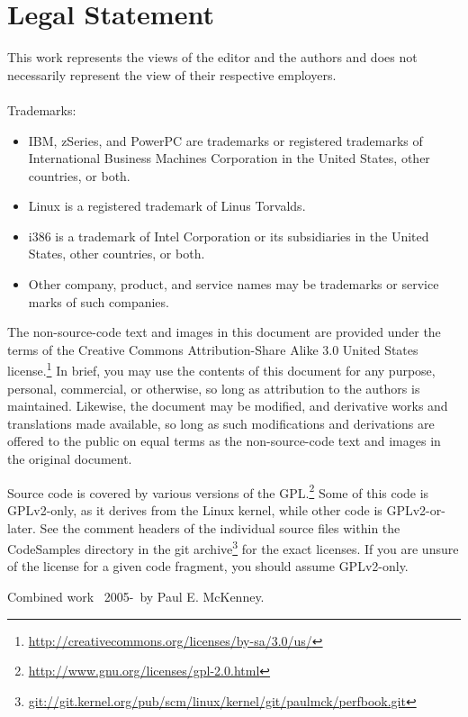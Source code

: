 
\IfTwoColumn{\onecolumn}{}

\section*{Legal Statement}

This work represents the views of the editor and the authors and does not
necessarily represent the view of their respective employers. \\
\\
Trademarks:
\begin{itemize}
\item	IBM, zSeries, and PowerPC are trademarks or registered trademarks
	of International Business Machines Corporation in the United
	States, other countries, or both.
\item	Linux is a registered trademark of Linus Torvalds.
\item	i386 is a trademark of Intel Corporation or its subsidiaries
	in the United States, other countries, or both.
\item	Other company, product, and service names may be trademarks or
	service marks of such companies.
\end{itemize}

The non-source-code text and images in this document are provided under
the terms of the Creative Commons Attribution-Share Alike 3.0 United
States license.\footnote{
	\url{http://creativecommons.org/licenses/by-sa/3.0/us/}}
In brief, you may use the contents of this document for any purpose,
personal, commercial, or otherwise, so long as attribution to the
authors is maintained.  Likewise, the document may be modified,
and derivative works and translations made available, so long as
such modifications and derivations are offered to the public on equal
terms as the non-source-code text and images in the original document.

Source code is covered by various versions of the GPL.\footnote{
	\url{http://www.gnu.org/licenses/gpl-2.0.html}}
Some of this code is GPLv2-only, as it derives from the Linux kernel,
while other code is GPLv2-or-later.
See the comment headers of the individual source files within the
CodeSamples directory in the git archive\footnote{
	\url{git://git.kernel.org/pub/scm/linux/kernel/git/paulmck/perfbook.git}}
for the exact licenses.
If you are unsure of the license for a given code fragment,
you should assume GPLv2-only.

Combined work {\textcopyright}~2005-\commityear\ by Paul E. McKenney.

\IfTwoColumn{\twocolumn}{}
